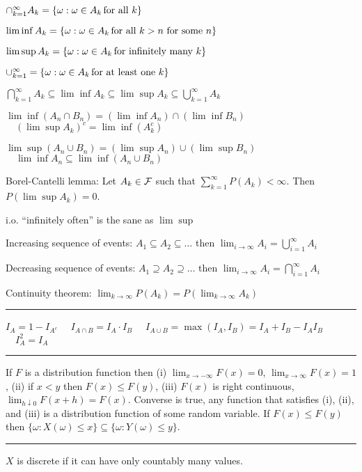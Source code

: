 \smallskip
$\cap_{k=1}^\infty A_k=\{\omega:\omega\in A_k\,
\hbox{for all $k$}\}$

$\lim\inf A_k=\{\omega:\omega\in A_k\,
\hbox{for all $k>n$ for some $n$}\}$

$\lim\sup A_k=\{\omega:\omega\in A_k\,
\hbox{for infinitely many $k$}\}$

$\cup_{k=1}^\infty=\{\omega:\omega\in A_k\,
\hbox{for at least one $k$}\}$

\smallskip
\centerline{
$\displaystyle
\bigcap_{k=1}^\infty A_k
\subseteq
\lim\inf A_k
\subseteq
\lim\sup A_k
\subseteq
\bigcup_{k=1}^\infty A_k
$}

\smallskip
$\lim\inf(A_n\cap B_n)=(\lim\inf A_n)\cap(\lim\inf B_n)$
$\quad(\lim\sup A_k)^c=\lim\inf(A_k^c)$

$\lim\sup(A_n\cup B_n)=(\lim\sup A_n)\cup(\lim\sup B_n)$
$\quad\lim\inf A_n\subseteq\lim\inf(A_n\cup B_n)$

\smallskip
Borel-Cantelli lemma:
Let $A_k\in\cal F$ such that
$\displaystyle\sum_{k=1}^\infty P(A_k)<\infty$.
Then $P(\lim\sup A_k)=0$.

\smallskip
i.o. ``infinitely often'' is the sane as $\lim\sup$

\smallskip
Increasing sequence of events:
$A_1\subseteq A_2\subseteq\ldots$ then
$\displaystyle\lim_{i\to\infty}A_i=\bigcup_{i=1}^\infty A_i$

\smallskip
Decreasing sequence of events:
$A_1\supseteq A_2\supseteq\ldots$ then
$\displaystyle\lim_{i\to\infty}A_i=\bigcap_{i=1}^\infty A_i$

\smallskip
Continuity theorem:
$\lim_{k\to\infty}P(A_k)=P(\lim_{k\to\infty}A_k)$

\smallskip
\hrule

\smallskip
$I_A=1-I_{A^c}$
$\quad I_{A\cap B}=I_A\cdot I_B$
$\quad I_{A\cup B}=\max(I_A,I_B)=I_A+I_B-I_AI_B$
$\quad I_A^2=I_A$

\smallskip
\hrule

\smallskip
If $F$ is a distribution function then
(i) $\lim_{x\to-\infty}F(x)=0$,
$\lim_{x\to\infty}F(x)=1$,
(ii) if $x<y$ then $F(x)\le F(y)$,
(iii) $F(x)$ is right continuous,
$\lim_{h\downarrow0}F(x+h)=F(x)$.
Converse is true, any function that satisfies (i), (ii), and (iii)
is a distribution function of some random variable.
If $F(x)\le F(y)$ then $\{\omega:X(\omega)\le x\}
\subseteq\{\omega:Y(\omega)\le y\}$.

\smallskip
\hrule

\smallskip
$X$ is discrete if it can have only countably many values.

